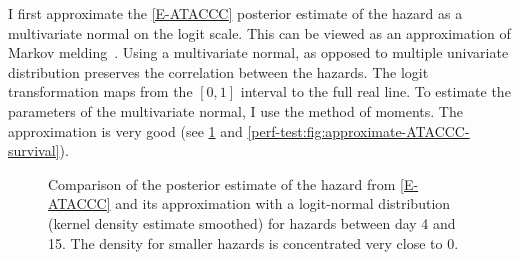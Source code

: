 \documentclass[thesis.tex]{subfiles}
\begin{document}
I first approximate the \cref{E-ATACCC} posterior estimate of the hazard as a multivariate normal on the logit scale.
This can be viewed as an approximation of Markov melding~\autocite{goudieJoining}.
Using a multivariate normal, as opposed to multiple univariate distribution preserves the correlation between the hazards.
The logit transformation maps from the $[0, 1]$ interval to the full real line.
To estimate the parameters of the multivariate normal, I use the method of moments.
The approximation is very good (see \cref{perf-test:fig:approximate-ATACCC-hazard} and \cref{perf-test:fig:approximate-ATACCC-survival}).
\begin{figure}
  \caption[Approximating the ATACCC posterior hazard as a logit-normal]{Comparison of the posterior estimate of the hazard from \cref{E-ATACCC} and its approximation with a logit-normal distribution (kernel density estimate smoothed) for hazards between day 4 and 15. The density for smaller hazards is concentrated very close to 0. \label{perf-test:fig:approximate-ATACCC-hazard}}
\end{figure}
\end{document}
